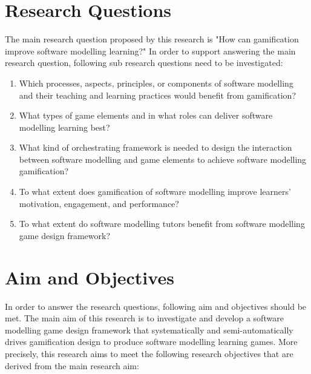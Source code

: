 \documentclass[12pt, a4paper]{report}
\begin{document}
\section{Research Questions}
The main research question proposed by this research is "How can gamification improve software modelling learning?" In order to support answering the main research question, following sub research questions need to be investigated:
\begin{enumerate}
\item Which processes, aspects, principles, or components of software modelling and their teaching and learning practices would benefit from gamification?
\item What types of game elements and in what roles can deliver software modelling learning best? 
\item What kind of orchestrating framework is needed to design the interaction between software modelling and game elements to achieve software modelling gamification?
\item To what extent does gamification of software modelling improve learners' motivation, engagement, and performance?
\item To what extent do software modelling tutors benefit from software modelling game design framework?
\end{enumerate}

\section{Aim and Objectives}
In order to answer the research questions, following aim and objectives should be met. The main aim of this research is to investigate and develop a software modelling game design framework that systematically and semi-automatically drives gamification design to produce software modelling learning games. More precisely, this research aims to meet the following research objectives that are derived from the main research aim:
\end{document}
